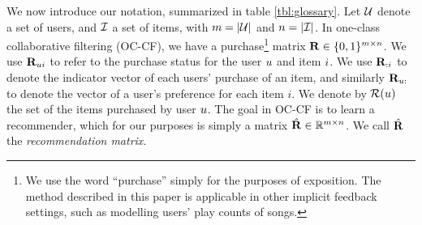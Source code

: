 
We now introduce our notation, summarized in table \ref{tbl:glossary}. %
Let $\mathcal{U}$ denote a set of users, and $\mathcal{I}$ a set of items,
with $m = | \mathcal{U} |$ and $n = | \mathcal{I} |$.
In one-class collaborative filtering (OC-CF), we have a purchase\footnote{We use the word ``purchase'' simply for the purposes of exposition. The method described in this paper is applicable in other implicit feedback settings, such as modelling users' play counts of songs.} 
matrix $\mathbf{R} \in \{ 0, 1 \}^{m \times n}$. %
We use $\mathbf{R}_{ui}$ to refer to the purchase status for the user $u$ and item $i$.
We use $\mathbf{R}_{:i}$ to denote the indicator vector of each users' purchase of an item, and similarly $\mathbf{R}_{u:}$ to denote the vector of a user's preference for each item $i$.
We denote by  $\mathcal{R}(u)$ the set of the items purchased by user $u$. The goal in OC-CF is to learn a recommender, which for our purposes is simply a matrix $\hat{\mathbf{R}} \in \mathbb{R}^{m \times n}$. %
We call $\hat{\mathbf{R}}$ the \emph{recommendation matrix}.

\begin{table}[t]
	\centering
	\caption{Commonly used symbols.}
	\label{tbl:glossary}
\end{table}

